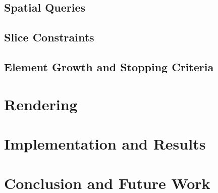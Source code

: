 \subsection{Spatial Queries}


\subsection{Slice Constraints}


\subsection{Element Growth and Stopping Criteria}


\section{Rendering}


\section{Implementation and Results}


\section{Conclusion and Future Work}


